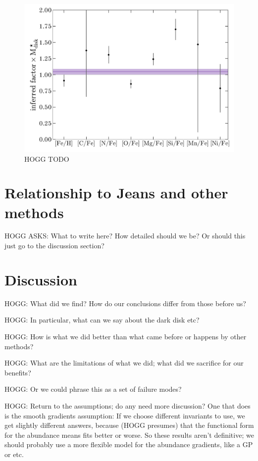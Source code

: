 \documentclass[modern]{aastex63}
\begin{document}
\begin{figure}[!tp]
  \begin{center}
  \includegraphics[width=\textwidth]{mdisk-vs-elem.pdf}
  \end{center}
  \caption{%
    HOGG TODO
  \label{fig:inferred-mdisk-elems}
  }
\end{figure}

\section{Relationship to Jeans and other methods}

HOGG ASKS: What to write here? How detailed should we be? Or should this just
go to the discussion section?

\section{Discussion}

HOGG: What did we find? How do our conclusions differ from those before us?

HOGG: In particular, what can we say about the dark disk etc?

HOGG: How is what we did better than what came before or happens by other methods?

HOGG: What are the limitations of what we did; what did we sacrifice for our benefits?

HOGG: Or we could phrase this as a set of failure modes?

HOGG: Return to the assumptions; do any need more discussion? One that does is the smooth
gradients assumption: If we choose different invariants to use, we get slightly different
answers, because (HOGG presumes) that the functional form for the abundance means fits
better or worse. So these results aren't definitive; we should probably use a more flexible
model for the abundance gradients, like a GP or etc.
\end{document}
